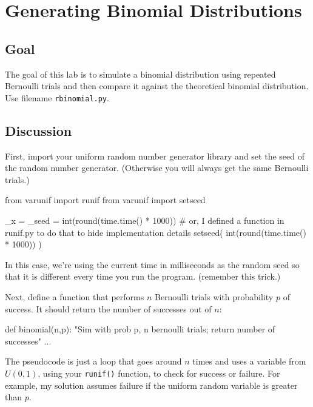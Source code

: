 \chapter{Generating Binomial Distributions}

\setcounter{problem}{1}
\section{Goal}

\begin{fullwidth}

The goal of this lab is to simulate a binomial distribution using repeated Bernoulli trials and then compare it against the theoretical binomial distribution. Use filename {\tt rbinomial.py}.

\section{Discussion}

\step First, import your uniform random number generator library and set the seed of the random number generator.
(Otherwise you will always get the same Bernoulli trials.) 

\begin{pyverbatim}
from varunif import runif
from varunif import setseed

_x = _seed = int(round(time.time() * 1000)) 
# or, I defined a function in runif.py to do that to hide implementation details
setseed( int(round(time.time() * 1000)) )
\end{pyverbatim}

In this case, we're using the current time in milliseconds as the random seed so that it is different every time you run the program. (remember this trick.)

\step Next, define a function that performs $n$ Bernoulli trials with probability $p$ of success. It should return the number of successes out of $n$:

\begin{pyverbatim}
def binomial(n,p):
    "Sim with prob p, n bernoulli trials; return number of successes"
    ...
\end{pyverbatim}

The pseudocode is just a loop that goes around $n$ times and uses a variable from $U(0,1)$, using your {\tt runif()} function, to check for success or failure. For example, my solution assumes failure if the uniform random variable is greater than $p$.
    

\end{fullwidth}
